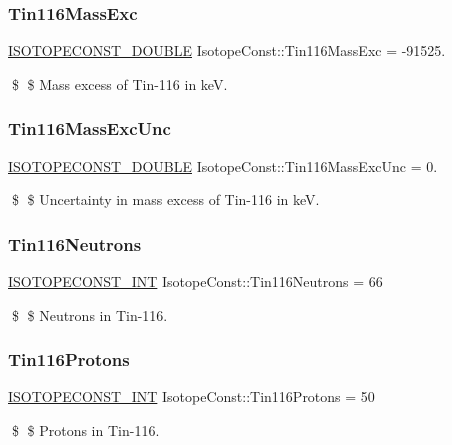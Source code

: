\subsubsection{\texorpdfstring{Tin116\+Mass\+Exc}{Tin116MassExc}}
{\footnotesize\ttfamily \mbox{\hyperlink{group___isotope_const-_macros_ga8f45a7272ce02c0b4c65c44636ed719a}{I\+S\+O\+T\+O\+P\+E\+C\+O\+N\+S\+T\+\_\+\+D\+O\+U\+B\+LE}} Isotope\+Const\+::\+Tin116\+Mass\+Exc = -\/91525.}

\$ \$ Mass excess of Tin-\/116 in keV. \mbox{\label{group___isotope_const-_tin-_sn116_gaa81e615155f1c5cfe41f0a84d9c27e83}} 
\subsubsection{\texorpdfstring{Tin116\+Mass\+Exc\+Unc}{Tin116MassExcUnc}}
{\footnotesize\ttfamily \mbox{\hyperlink{group___isotope_const-_macros_ga8f45a7272ce02c0b4c65c44636ed719a}{I\+S\+O\+T\+O\+P\+E\+C\+O\+N\+S\+T\+\_\+\+D\+O\+U\+B\+LE}} Isotope\+Const\+::\+Tin116\+Mass\+Exc\+Unc = 0.}

\$ \$ Uncertainty in mass excess of Tin-\/116 in keV. \mbox{\label{group___isotope_const-_tin-_sn116_gab9ea54c3adad06d9366ab4a0f12bb83b}} 
\subsubsection{\texorpdfstring{Tin116\+Neutrons}{Tin116Neutrons}}
{\footnotesize\ttfamily \mbox{\hyperlink{group___isotope_const-_macros_ga5f18360b3e99483a35c32d789e62621c}{I\+S\+O\+T\+O\+P\+E\+C\+O\+N\+S\+T\+\_\+\+I\+NT}} Isotope\+Const\+::\+Tin116\+Neutrons = 66}

\$ \$ Neutrons in Tin-\/116. \mbox{\label{group___isotope_const-_tin-_sn116_ga170919238dff5c84f0e2b41f7950fb47}} 
\subsubsection{\texorpdfstring{Tin116\+Protons}{Tin116Protons}}
{\footnotesize\ttfamily \mbox{\hyperlink{group___isotope_const-_macros_ga5f18360b3e99483a35c32d789e62621c}{I\+S\+O\+T\+O\+P\+E\+C\+O\+N\+S\+T\+\_\+\+I\+NT}} Isotope\+Const\+::\+Tin116\+Protons = 50}

\$ \$ Protons in Tin-\/116. 
